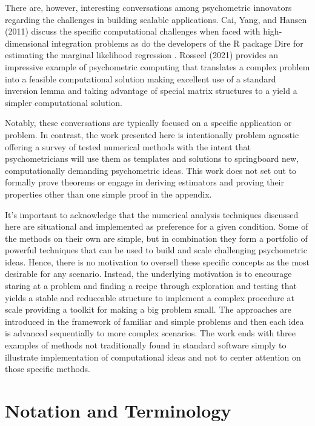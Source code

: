 \documentclass[12pt]{article}
\begin{document}
There are, however, interesting conversations among psychometric innovators regarding the challenges in building scalable applications. Cai, Yang, and Hansen (2011) discuss the specific computational challenges when faced with high-dimensional integration problems as do the developers of the R package Dire \cite{dire} for estimating the marginal likelihood regression \cite{mislevy}. Rosseel (2021) provides an impressive example of psychometric computing that translates a complex problem into a feasible computational solution making excellent use of a standard inversion lemma and taking advantage of special matrix structures to a yield a simpler computational solution. \nocite{cai} \nocite{psych3020017}

Notably, these conversations are typically focused on a specific application or problem. In contrast, the work presented here is intentionally problem agnostic offering a survey of tested numerical methods with the intent that psychometricians will use them as templates and solutions to springboard new, computationally demanding psychometric ideas. This work does not set out to formally prove theorems or engage in deriving estimators and proving their properties other than one simple proof in the appendix. 

It's important to acknowledge that the numerical analysis techniques discussed here are situational and implemented as preference for a given condition. Some of the methods on their own are simple, but in combination they form a portfolio of powerful techniques that can be used to build and scale challenging psychometric ideas. Hence, there is no motivation to oversell these specific concepts as the most desirable for any scenario. Instead, the underlying motivation is to encourage staring at a problem and finding a recipe through exploration and testing that yields a stable and reduceable structure to implement a complex procedure at scale providing a toolkit for making a big problem small. The approaches are introduced in the framework of familiar and simple problems and then each idea is advanced sequentially to more complex scenarios. The work ends with three examples of methods not traditionally found in standard software simply to illustrate implementation of computational ideas and not to center attention on those specific methods. 

\section*{Notation and Terminology}
\end{document}
